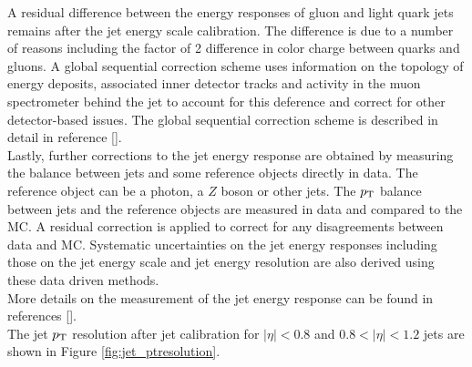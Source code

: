 \indent A residual difference between the energy responses of gluon and light quark jets remains after the jet energy scale calibration.\cite{JetCalibration13TeV}  The difference is due to a number of reasons including the factor of 2 difference in color charge between quarks and gluons. A global sequential correction scheme uses information on the topology of energy deposits, associated inner detector tracks and activity in the muon spectrometer behind the jet to account for this deference and correct for other detector-based issues.  The global sequential correction scheme is described in detail in reference [\cite{jet_GSC}]. \\


\indent Lastly, further corrections to the jet energy response are obtained by measuring the balance between jets and some reference objects directly in data.  The reference object can be a photon, a $Z$ boson or other jets.  The $p_{\mathrm{T}}$ balance between jets and the reference objects are measured in data and compared to the MC.  A residual correction is applied to correct for any disagreements between data and MC.  Systematic uncertainties on the jet energy responses including those on the jet energy scale and jet energy resolution are also derived using these data driven methods. \\

\indent More details on the measurement of the jet energy response can be found in references [\cite{JES_ZGamma,JES_dijet}].\\ %


\indent The jet $p_{\mathrm{T}}$ resolution after jet calibration for $|\eta|<0.8$ and $0.8<|\eta|<1.2$ jets are shown in Figure \ref{fig:jet_ptresolution}.\cite{JES_dijet} \\

